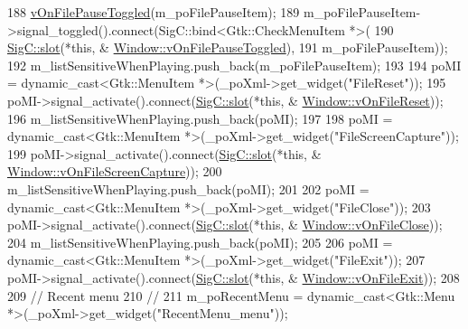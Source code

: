 \begin{DoxyCode}
{{188   \mbox{\hyperlink{class_v_b_a_1_1_window_a8cfc0cc364908602c3881304be30dfe4}{vOnFilePauseToggled}}(m\_poFilePauseItem);
189   m\_poFilePauseItem->signal\_toggled().connect(SigC::bind<Gtk::CheckMenuItem *>(
190                                                 \mbox{\hyperlink{namespace_sig_c_a92e4f19202b77e78ac1db05f5a62f6b6}{SigC::slot}}(*\textcolor{keyword}{this}, &
      \mbox{\hyperlink{class_v_b_a_1_1_window_a8cfc0cc364908602c3881304be30dfe4}{Window::vOnFilePauseToggled}}),
191                                                 m\_poFilePauseItem));
192   m\_listSensitiveWhenPlaying.push\_back(m\_poFilePauseItem);
193 
194   poMI = \textcolor{keyword}{dynamic\_cast<}Gtk::MenuItem *\textcolor{keyword}{>}(\_poXml->get\_widget(\textcolor{stringliteral}{"FileReset"}));
195   poMI->signal\_activate().connect(\mbox{\hyperlink{namespace_sig_c_a92e4f19202b77e78ac1db05f5a62f6b6}{SigC::slot}}(*\textcolor{keyword}{this}, &
      \mbox{\hyperlink{class_v_b_a_1_1_window_acd364daa2b85fc1c6b34d096305d8b48}{Window::vOnFileReset}}));
196   m\_listSensitiveWhenPlaying.push\_back(poMI);
197 
198   poMI = \textcolor{keyword}{dynamic\_cast<}Gtk::MenuItem *\textcolor{keyword}{>}(\_poXml->get\_widget(\textcolor{stringliteral}{"FileScreenCapture"}));
199   poMI->signal\_activate().connect(\mbox{\hyperlink{namespace_sig_c_a92e4f19202b77e78ac1db05f5a62f6b6}{SigC::slot}}(*\textcolor{keyword}{this}, &
      \mbox{\hyperlink{class_v_b_a_1_1_window_ae96308c56cf84f9c56dc97c196adc49c}{Window::vOnFileScreenCapture}}));
200   m\_listSensitiveWhenPlaying.push\_back(poMI);
201 
202   poMI = \textcolor{keyword}{dynamic\_cast<}Gtk::MenuItem *\textcolor{keyword}{>}(\_poXml->get\_widget(\textcolor{stringliteral}{"FileClose"}));
203   poMI->signal\_activate().connect(\mbox{\hyperlink{namespace_sig_c_a92e4f19202b77e78ac1db05f5a62f6b6}{SigC::slot}}(*\textcolor{keyword}{this}, &
      \mbox{\hyperlink{class_v_b_a_1_1_window_a9bb969481b9cfea3b5b5bc157ccc0ff6}{Window::vOnFileClose}}));
204   m\_listSensitiveWhenPlaying.push\_back(poMI);
205 
206   poMI = \textcolor{keyword}{dynamic\_cast<}Gtk::MenuItem *\textcolor{keyword}{>}(\_poXml->get\_widget(\textcolor{stringliteral}{"FileExit"}));
207   poMI->signal\_activate().connect(\mbox{\hyperlink{namespace_sig_c_a92e4f19202b77e78ac1db05f5a62f6b6}{SigC::slot}}(*\textcolor{keyword}{this}, &
      \mbox{\hyperlink{class_v_b_a_1_1_window_acf22a1b1a9e46ac71e466f160d4e672e}{Window::vOnFileExit}}));
208 
209   \textcolor{comment}{// Recent menu}
210   \textcolor{comment}{//}
211   m\_poRecentMenu = \textcolor{keyword}{dynamic\_cast<}Gtk::Menu *\textcolor{keyword}{>}(\_poXml->get\_widget(\textcolor{stringliteral}{"RecentMenu\_menu"}));
}}
\end{DoxyCode}
